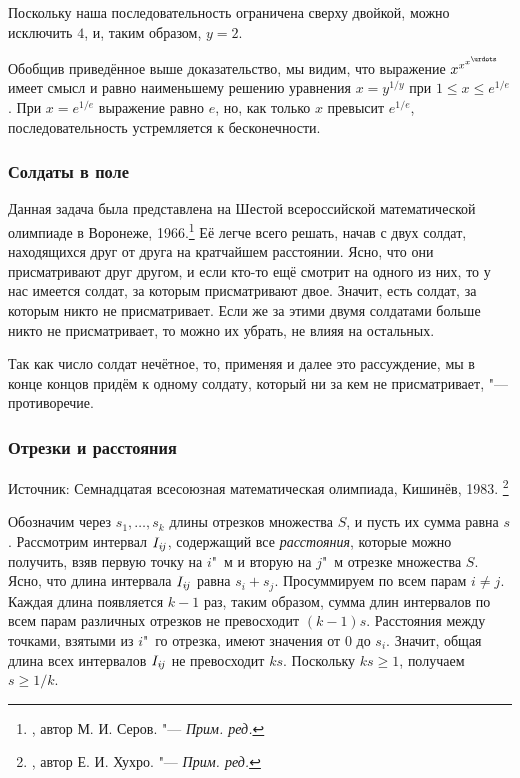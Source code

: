 \documentclass[twoside]{book}
\begin{document}
Поскольку наша последовательность ограничена сверху двойкой, можно исключить $4$, и, таким образом, $y=2$.\heart

Обобщив приведённое выше доказательство, мы видим, что выражение $x^{x^{x^{\urdots}}}$
имеет смысл и равно наименьшему решению уравнения $x=y^{1/y}$ при $1\le x\le e^{1/e}$.
При $x=e^{1/e}$ выражение равно $e$, но, как только $x$ превысит $e^{1/e}$, последовательность устремляется к бесконечности.

\subsubsection*{Солдаты в поле}%
Данная задача была представлена на Шестой всероссийской математической олимпиаде в Воронеже, 1966.\footnote{\cite[№72]{ВсМО}, автор М. И. Серов. "--- \emph{Прим. ред.}}
Её легче всего решать, начав с двух солдат, находящихся друг от друга на кратчайшем расстоянии.
Ясно, что они присматривают друг другом, и если кто-то ещё смотрит на одного из них, то у нас имеется солдат, за которым присматривают двое. 
Значит, есть солдат, за которым никто не присматривает.
Если же за этими двумя солдатами больше никто не присматривает, то можно их убрать, не влияя на остальных.

Так как число солдат нечётное, то, применяя и далее это рассуждение, мы в конце концов придём к одному солдату, который ни за кем не присматривает, "--- противоречие.\heart

\subsubsection*{Отрезки и расстояния} %

\indent

\medskip

{\small


Источник:
Семнадцатая всесоюзная математическая олимпиада, Кишинёв, 1983.%
\footnote{\cite[№369]{ВсМО}, автор  Е. И. Хухро. "--- \emph{Прим. ред.}}

}
\medskip

Обозначим через $s_1,\dots,s_k$ длины отрезков множества $S$,
и пусть их сумма равна $s$.
Рассмотрим интервал $I_{i\mkern-2mu j}$, содержащий все \emph{расстояния}, которые можно получить, взяв первую точку на $i$"~м и вторую на $j$"~м отрезке множества $S$.
Ясно, что длина интервала $I_{i\mkern-2mu j}$ равна $s_i+s_j$.
Просуммируем по всем парам $i\ne j$. Каждая длина появляется $k-1$ раз,
таким образом, сумма длин интервалов по всем парам различных отрезков не превосходит $(k-1) s$.
Расстояния между точками, взятыми из $i$"~го отрезка, имеют значения от $0$ до $s_i$.
Значит, общая длина всех интервалов $I_{i\mkern-2mu j}$ не превосходит $k s$.
Поскольку $k s\ge 1$, получаем $s\ge 1/k$.
\heart
\end{document}

